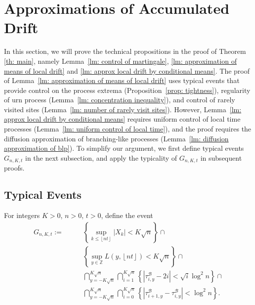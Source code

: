 \documentclass[EJP]{ejpecp} %
\begin{document}
\section{Approximations of Accumulated Drift}\label{sec: approximations}

In this section, we will prove the technical propositions in the proof of Theorem \ref{th: main}, namely Lemma~\ref{lm: control of martingale}, \ref{lm: approximation of means of local drift} and \ref{lm: approx local drift by conditional means}. 
The proof of Lemma~\ref{lm: approximation of means of local drift} uses typical events that provide control on the process extrema (Proposition~\ref{prop: tightness}), regularity of urn process (Lemma~\ref{lm: concentration inequality}), and control of rarely visited sites (Lemma~\ref{lm: number of rarely visit sites}). 
However, Lemma~\ref{lm: approx local drift by conditional means} requires uniform control of local time processes (Lemma~\ref{lm: uniform control of local time}), and the proof requires the diffusion approximation of branching-like processes (Lemma~\ref{lm: diffusion approximation of blp}).
To simplify our argument, we first define typical events $G_{n, K, t}$ in the next subsection, and apply the typicality of $G_{n, K, t}$ in subsequent proofs.

\subsection{Typical Events}

For integers $K>0$, $n > 0$, $t>0$, define the event
\begin{align}
	G_{n,K,t} :=  \qquad
	\label{eq:good-event-1}
	& \left\{\sup _{k \le \left\lfloor nt  \right\rfloor} |X_k| < K \sqrt{n} \right\} \cap \\
	\label{eq:good-event-2}
	& \left\{\sup_{y \in \mathbb{Z}} L(y, \left\lfloor nt  \right\rfloor) < K \sqrt{n} \right\} \cap \\
	\label{eq:good-event-3}
	& \bigcap_{y = - K \sqrt{n} }^{K \sqrt{n}} 
	\bigcap_{i = 1}^{K \sqrt{n} } \left\{\left| \tau_{i,y}^{\mathscr{B}} - 2 i \right| < \sqrt{ i } \log^2 n \right\}  \cap \\
	\label{eq:good-event-4}
	& \bigcap_{y = - K \sqrt{n} }^{K \sqrt{n}} 
	\bigcap_{i = 0}^{K \sqrt{n} } \left\{\left| \tau_{i+1, y}^{\mathscr{B}} - \tau_{i,y}^{\mathscr{B}} \right| < \log^2 n \right\}  
	.\end{align}
\end{document}
